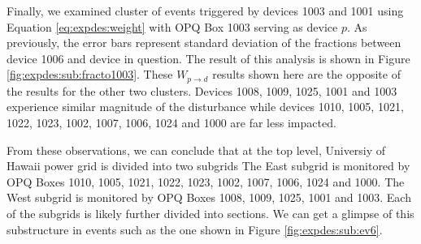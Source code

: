 Finally, we examined cluster of events triggered by devices 1003 and 1001 using Equation \ref{eq:expdes:weight} with OPQ Box 1003 serving as device $p$.
As previously, the error bars represent standard deviation of the fractions between device 1006 and device in question.
The result of this analysis is shown in Figure \ref{fig:expdes:sub:fracto1003}.
These $W_{p \rightarrow d}$ results shown here are the opposite of the results for the other two clusters.
Devices 1008, 1009, 1025, 1001 and 1003 experience similar magnitude of the disturbance while devices 1010, 1005, 1021, 1022, 1023, 1002, 1007, 1006, 1024 and 1000 are far less impacted.

From these observations, we can conclude that at the top level, Universiy of Hawaii power grid is divided into two subgrids
The East subgrid is monitored by OPQ Boxes 1010, 1005, 1021, 1022, 1023, 1002, 1007, 1006, 1024 and 1000.
The West subgrid is monitored by OPQ Boxes 1008, 1009, 1025, 1001 and 1003.
Each of the subgrids is likely further divided into sections.
We can get a glimpse of this substructure in events such as the one shown in Figure \ref{fig:expdes:sub:ev6}.
